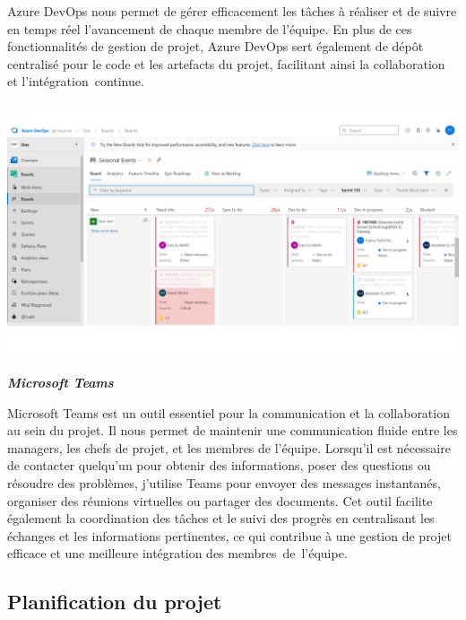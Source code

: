 Azure DevOps nous permet de gérer efficacement les tâches à réaliser et de suivre en temps réel l'avancement de chaque membre de l'équipe. En plus de ces fonctionnalités de gestion de projet, Azure DevOps sert également de dépôt centralisé pour le code et les artefacts du projet, facilitant ainsi la collaboration et l'intégration continue.
\begin{center}
    \centering
    \includegraphics[width=18cm]{Figures/azure DevOps-tickets.png}
\end{center}

\textbf{\textbullet \textit{Microsoft Teams}}

Microsoft Teams est un outil essentiel pour la communication et la collaboration au sein du projet. Il nous permet de maintenir une communication fluide entre les managers, les chefs de projet, et les membres de l'équipe. Lorsqu'il est nécessaire de contacter quelqu'un pour obtenir des informations, poser des questions ou résoudre des problèmes, j'utilise Teams pour envoyer des messages instantanés, organiser des réunions virtuelles ou partager des documents. Cet outil facilite également la coordination des tâches et le suivi des progrès en centralisant les échanges et les informations pertinentes, ce qui contribue à une gestion de projet efficace et une meilleure intégration des membres de l'équipe.


\subsection{Planification du projet}
